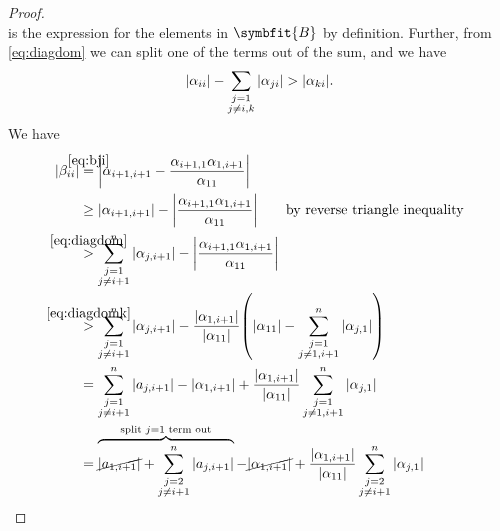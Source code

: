\documentclass{article}
\theoremstyle{definition}
\newcommand{\mat}[1]{\symbfit{#1}}
\begin{document}
\begin{enumerate}[leftmargin=\labelsep]
\begin{proof}
\begin{equation}
		      \end{equation}
		      is the expression for the elements in \(\mat{B}\) by definition. Further, from \cref{eq:diagdom} we can split one of the terms out of the sum, and we have
		      \begin{equation}
			      \abs{\alpha_{ii}} - \sum_{\substack{j=1\\j\neq i,k}} \abs{\alpha_{ji}} > \abs{\alpha_{ki}}. \label{eq:diagdomk}
		      \end{equation}
		      We have
			      {
				      \allowdisplaybreaks
				      \begin{align*}
					      \abs{\beta_{ii}} & \stackrel{\mathclap{\eqref{eq:bji}}}{=} \abs{\alpha_{i+1,i+1} - \frac{\alpha_{i+1,1}\alpha_{1,i+1}}{\alpha_{11}}}                                                                                                                                                   \\
					                       & \geq \abs{\alpha_{i+1,i+1}} - \abs{\frac{\alpha_{i+1,1}\alpha_{1,i+1}}{\alpha_{11}}} \qquad\text{by reverse triangle inequality}                                                                                                                                    \\
					                       & \stackrel{\mathclap{\eqref{eq:diagdom}}}{>} \sum_{\substack{j=1\\j\neq i+1}}^n \abs{\alpha_{j,i+1}} - \abs{\frac{\alpha_{i+1,1}\alpha_{1,i+1}}{\alpha_{11}}}                                                                                                        \\
					                       & \stackrel{\mathclap{\eqref{eq:diagdomk}}}{>} \sum_{\substack{j=1\\j\neq i+1}}^n \abs{\alpha_{j,i+1}} - \frac{\abs{\alpha_{1,i+1}}}{\abs{\alpha_{11}}}\qty( \abs{\alpha_{11}} - \sum_{\substack{j=1\\j\neq 1,i+1}}^n \abs{\alpha_{j,1}})                             \\
					                       & = \sum_{\substack{j=1\\j\neq i+1}}^n \abs{a_{j,i+1}} - \abs{\alpha_{1,i+1}} + \frac{\abs{\alpha_{1,i+1}}}{\abs{\alpha_{11}}} \sum_{\substack{j=1\\j\neq 1,i+1}}^n \abs{\alpha_{j,1}}                                                                                \\
					                       & = \overbrace{\cancel{\abs{a_{1,i+1}}}+\sum_{\substack{j=2\\j\neq i+1}}^n \abs{a_{j,i+1}}}^{\text{split }j=1\text{ term out}} - \cancel{\abs{\alpha_{1,i+1}}} + \frac{\abs{\alpha_{1,i+1}}}{\abs{\alpha_{11}}} \sum_{\substack{j=2\\j\neq i+1}}^n \abs{\alpha_{j,1}} \\

\end{align*}}
\end{proof}
\end{enumerate}
\end{document}
